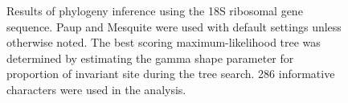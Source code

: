 \documentclass{article}\usepackage[]{graphicx}\usepackage[]{color}
\begin{document}
\begin{figure}[ht]
 \hspace{10pt}   
 \caption[fig:18s]{%
  Results of phylogeny inference using the 18S ribosomal gene sequence. 
  Paup and Mesquite were used with default settings unless otherwise noted. 
  The best scoring maximum-likelihood tree  was determined by estimating the gamma shape parameter for proportion of invariant site during the tree search.
  286 informative characters were used in the analysis.}
 \label{fig:18s}
\end{figure}
\end{document}
